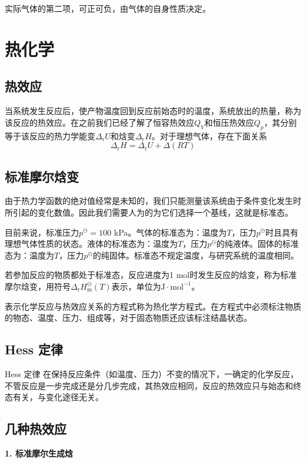\documentclass[lang=cn,newtx,11pt,scheme=chinese]{elegantbook}
\begin{document}
实际气体的第二项，可正可负，由气体的自身性质决定。

\section{热化学}
\subsection{热效应}
当系统发生反应后，使产物温度回到反应前始态时的温度，系统放出的热量，称为该反应的热效应。在之前我们已经了解了恒容热效应$Q_V$和恒压热效应$Q_p$，其分别等于该反应的热力学能变$\Delta_\mathrm{r}U$和焓变$\Delta_\mathrm{r}H$。对于理想气体，存在下面关系
\begin{equation}
	\Delta_\mathrm{r}H=\Delta_\mathrm{r}U+\Delta(RT)
\end{equation}

\subsection{标准摩尔焓变}
由于热力学函数的绝对值经常是未知的，我们只能测量该系统由于条件变化发生时所引起的变化数值。因此我们需要人为的为它们选择一个基线，这就是标准态。

目前来说，标准压力$p^\ominus = 100$ kPa。气体的标准态为：温度为$T$，压力$p^\ominus$时且具有理想气体性质的状态。液体的标准态为：温度为$T$，压力$p^\ominus$的纯液体。固体的标准态为：温度为$T$，压力$p^\ominus$的纯固体。标准态不规定温度，与研究系统的温度相同。

若参加反应的物质都处于标准态，反应进度为1 mol时发生反应的焓变，称为标准摩尔焓变，用符号$\Delta_{\mathrm{r}}H^{\ominus}_{\mathrm{m}}(T)$表示，单位为$\mathrm{J \cdot mol^{-1}}$。

表示化学反应与热效应关系的方程式称为热化学方程式。在方程式中必须标注物质的物态、温度、压力、组成等，对于固态物质还应该标注结晶状态。

\subsection{Hess 定律}
\begin{theorem}{Hess 定律}
	在保持反应条件（如温度、压力）不变的情况下，一确定的化学反应，不管反应是一步完成还是分几步完成，其热效应相同，反应的热效应只与始态和终态有关，与变化途径无关。
\end{theorem}

\subsection{几种热效应}
\textbf{1. 标准摩尔生成焓}
\end{document}
